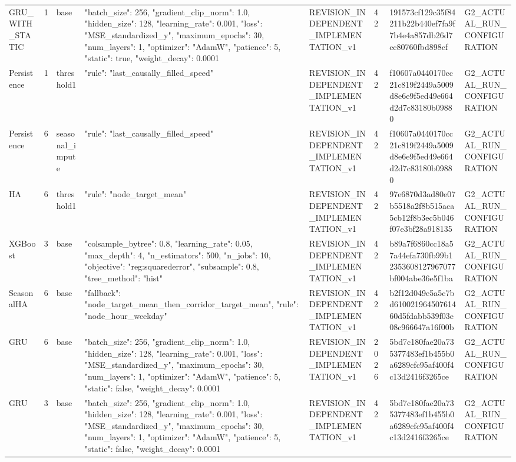 \begin{longtable}{llllllll}
GRU\_WITH\_STATIC & 1 & base & {"batch\_size": 256, "gradient\_clip\_norm": 1.0, "hidden\_size": 128, "learning\_rate": 0.001, "loss": "MSE\_standardized\_y", "maximum\_epochs": 30, "num\_layers": 1, "optimizer": "AdamW", "patience": 5, "static": true, "weight\_decay": 0.0001} & REVISION\_INDEPENDENT\_IMPLEMENTATION\_v1 & 42 & 191573cf129c35f84211b22b440ef7fa9f7b4e4a857db26d7cc80760fbd898cf & G2\_ACTUAL\_RUN\_CONFIGURATION \\
Persistence & 1 & threshold1 & {"rule": "last\_causally\_filled\_speed"} & REVISION\_INDEPENDENT\_IMPLEMENTATION\_v1 & 42 & f10607a0440170cc21c819f2449a5009d8e6e9f5ed49e664d2d7c83180b09880 & G2\_ACTUAL\_RUN\_CONFIGURATION \\
Persistence & 6 & seasonal\_impute & {"rule": "last\_causally\_filled\_speed"} & REVISION\_INDEPENDENT\_IMPLEMENTATION\_v1 & 42 & f10607a0440170cc21c819f2449a5009d8e6e9f5ed49e664d2d7c83180b09880 & G2\_ACTUAL\_RUN\_CONFIGURATION \\
HA & 6 & threshold1 & {"rule": "node\_target\_mean"} & REVISION\_INDEPENDENT\_IMPLEMENTATION\_v1 & 42 & 97e6870d3ad80e07b5518a2f8b515aca5cb12f8b3ec5b046f07e3bf28a918135 & G2\_ACTUAL\_RUN\_CONFIGURATION \\
XGBoost & 3 & base & {"colsample\_bytree": 0.8, "learning\_rate": 0.05, "max\_depth": 4, "n\_estimators": 500, "n\_jobs": 10, "objective": "reg:squarederror", "subsample": 0.8, "tree\_method": "hist"} & REVISION\_INDEPENDENT\_IMPLEMENTATION\_v1 & 42 & b89a7f6860cc18a57a44efa730fb99b12353608127967077bf004abe36e5f1ba & G2\_ACTUAL\_RUN\_CONFIGURATION \\
SeasonalHA & 6 & base & {"fallback": "node\_target\_mean\_then\_corridor\_target\_mean", "rule": "node\_hour\_weekday"} & REVISION\_INDEPENDENT\_IMPLEMENTATION\_v1 & 42 & b2f12d049e5a5c7bd61002196450761460d5fdabb539f03e08c966647a16f00b & G2\_ACTUAL\_RUN\_CONFIGURATION \\
GRU & 6 & base & {"batch\_size": 256, "gradient\_clip\_norm": 1.0, "hidden\_size": 128, "learning\_rate": 0.001, "loss": "MSE\_standardized\_y", "maximum\_epochs": 30, "num\_layers": 1, "optimizer": "AdamW", "patience": 5, "static": false, "weight\_decay": 0.0001} & REVISION\_INDEPENDENT\_IMPLEMENTATION\_v1 & 2026 & 5bd7c180fae20a735377483ef1b455b0a6289cfc95af400f4c13d2416f3265ce & G2\_ACTUAL\_RUN\_CONFIGURATION \\
GRU & 3 & base & {"batch\_size": 256, "gradient\_clip\_norm": 1.0, "hidden\_size": 128, "learning\_rate": 0.001, "loss": "MSE\_standardized\_y", "maximum\_epochs": 30, "num\_layers": 1, "optimizer": "AdamW", "patience": 5, "static": false, "weight\_decay": 0.0001} & REVISION\_INDEPENDENT\_IMPLEMENTATION\_v1 & 42 & 5bd7c180fae20a735377483ef1b455b0a6289cfc95af400f4c13d2416f3265ce & G2\_ACTUAL\_RUN\_CONFIGURATION \\

\end{longtable}
